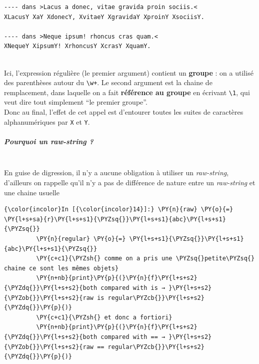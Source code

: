     \begin{Verbatim}[commandchars=\\\{\}]
---- dans >Lacus a donec, vitae gravida proin sociis.<
XLacusY XaY XdonecY, XvitaeY XgravidaY XproinY XsociisY.

---- dans >Neque ipsum! rhoncus cras quam.<
XNequeY XipsumY! XrhoncusY XcrasY XquamY.


    \end{Verbatim}

    Ici, l'expression régulière (le premier argument) contient un
\textbf{groupe} : on a utilisé des parenthèses autour du
\texttt{\textbackslash{}w+}. Le second argument est la chaine de
remplacement, dans laquelle on a fait \textbf{référence au groupe} en
écrivant \texttt{\textbackslash{}1}, qui veut dire tout simplement ``le
premier groupe''.\\

Donc au final, l'effet de cet appel est d'entourer toutes les suites de
caractères alphanumériques par \texttt{X} et \texttt{Y}.

    \hypertarget{pourquoi-un-raw-string}{%
\subparagraph{\texorpdfstring{Pourquoi un \emph{raw-string}
?}{Pourquoi un raw-string ?}\\\\}\label{pourquoi-un-raw-string}}

    En guise de digression, il n'y a aucune obligation à utiliser un
\emph{raw-string}, d'ailleurs on rappelle qu'il n'y a pas de différence
de nature entre un \emph{raw-string} et une chaine usuelle

    \begin{Verbatim}[commandchars=\\\{\}]
{\color{incolor}In [{\color{incolor}14}]:} \PY{n}{raw} \PY{o}{=} \PY{l+s+sa}{r}\PY{l+s+s1}{\PYZsq{}}\PY{l+s+s1}{abc}\PY{l+s+s1}{\PYZsq{}}
         \PY{n}{regular} \PY{o}{=} \PY{l+s+s1}{\PYZsq{}}\PY{l+s+s1}{abc}\PY{l+s+s1}{\PYZsq{}}
         \PY{c+c1}{\PYZsh{} comme on a pris une \PYZsq{}petite\PYZsq{} chaine ce sont les mêmes objets}
         \PY{n+nb}{print}\PY{p}{(}\PY{n}{f}\PY{l+s+s2}{\PYZdq{}}\PY{l+s+s2}{both compared with is → }\PY{l+s+s2}{\PYZob{}}\PY{l+s+s2}{raw is regular\PYZcb{}}\PY{l+s+s2}{\PYZdq{}}\PY{p}{)}
         \PY{c+c1}{\PYZsh{} et donc a fortiori}
         \PY{n+nb}{print}\PY{p}{(}\PY{n}{f}\PY{l+s+s2}{\PYZdq{}}\PY{l+s+s2}{both compared with == → }\PY{l+s+s2}{\PYZob{}}\PY{l+s+s2}{raw == regular\PYZcb{}}\PY{l+s+s2}{\PYZdq{}}\PY{p}{)}
\end{Verbatim}


